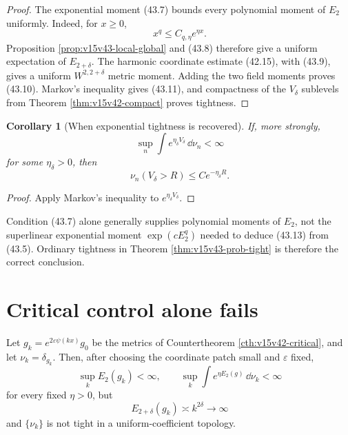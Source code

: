 \documentclass[11pt]{article}
\newtheorem{corollary}[theorem]{Corollary}
\theoremstyle{remark}
\begin{document}
\begin{proof}
The exponential moment (43.7) bounds every polynomial moment of
\(E_2\) uniformly.  Indeed, for \(x\geq0\),
\[
 x^q\leq C_{q,\eta}e^{\eta x}.                          \tag{43.12}
\]
Proposition \ref{prop:v15v43-local-global} and (43.8) therefore
give a uniform expectation of \(E_{2+\delta}\).  The harmonic
coordinate estimate (42.15), with (43.9), gives a uniform
\(W^{2,2+\delta}\) metric moment.  Adding the two field moments
proves (43.10).  Markov's inequality gives (43.11), and compactness
of the \(V_\delta\) sublevels from Theorem
\ref{thm:v15v42-compact} proves tightness.
\end{proof}

\begin{corollary}[When exponential tightness is recovered]
\label{cor:v15v43-exp-tight}
If, more strongly,
\[
 \sup_n\int e^{\eta_\delta V_\delta}\,\dd\nu_n<\infty    \tag{43.13}
\]
for some \(\eta_\delta>0\), then
\[
 \nu_n(V_\delta>R)\leq Ce^{-\eta_\delta R}.              \tag{43.14}
\]
\end{corollary}

\begin{proof}
Apply Markov's inequality to \(e^{\eta_\delta V_\delta}\).
\end{proof}

Condition (43.7) alone generally supplies polynomial moments of
\(E_2\), not the superlinear exponential moment
\(\exp(cE_2^q)\) needed to deduce (43.13) from (43.5).  Ordinary
tightness in Theorem \ref{thm:v15v43-prob-tight} is therefore the
correct conclusion.

\section{Critical control alone fails}

\begin{countertheorem}
\label{cth:v15v43-critical-random}
Let \(g_k=e^{2\varepsilon\psi(kx)}g_0\) be the metrics of
Countertheorem \ref{cth:v15v42-critical}, and let
\(\nu_k=\delta_{g_k}\).  Then, after choosing the coordinate patch
small and \(\varepsilon\) fixed,
\[
 \sup_k E_2(g_k)<\infty,\qquad
 \sup_k\int e^{\eta E_2(g)}\,\dd\nu_k<\infty             \tag{43.15}
\]
for every fixed \(\eta>0\), but
\[
 E_{2+\delta}(g_k)\asymp k^{2\delta}\longrightarrow\infty
                                                               \tag{43.16}
\]
and \(\{\nu_k\}\) is not tight in a uniform-coefficient topology.
\end{countertheorem}
\end{document}
